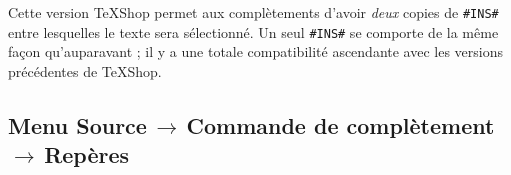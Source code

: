 \documentclass[11pt,french]{article}
\newcommand{\mnu}[1]{\textsf{#1}}
\newcommand{\To}{\,\(\to\)\,}
\newcommand{\TS}{\textsf{\TeX Shop}}
\newcommand{\CCT}{\textsf{CommandCompletion.txt}}
\begin{document}
Cette version \TS{} permet aux complètements d'avoir \emph{deux} copies de \texttt{\#INS\#} entre lesquelles le texte sera sélectionné. Un seul \texttt{\#INS\#} se comporte de la même façon qu'auparavant ; il y a une totale compatibilité ascendante avec les versions précédentes de \TS.

%

\subsection*{Menu \mnu{Source}\To\mnu{Commande de complètement}\To\mnu{Repères}}

\end{document}
